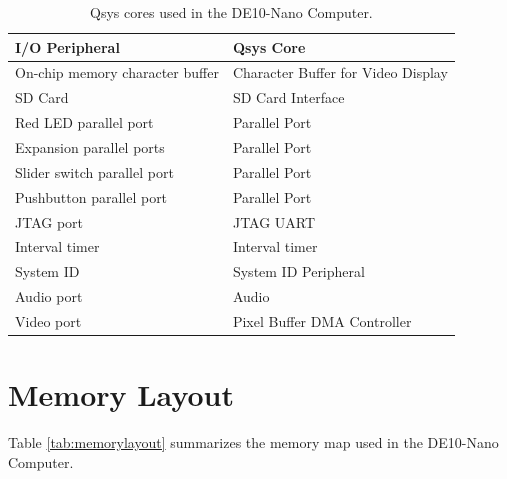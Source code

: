 \documentclass[11pt, twoside, pdftex]{article}
\newcommand{\commonFiles}{../../../common/doc}
\newcommand{\systemName}{DE10-Nano Computer}
\begin{document}
\begin{table}[h]
    \begin{center}
    \begin{tabular}{l|l}
            \textbf{I/O Peripheral}
            & \textbf{Qsys Core}
        \\\hline
            On-chip memory character buffer
				& Character Buffer for Video Display
        \\
            SD Card
        &   SD Card Interface
        \\
            Red LED parallel port
				& Parallel Port
        \\
            Expansion parallel ports
				& Parallel Port
        \\
            Slider switch parallel port
				& Parallel Port
        \\
            Pushbutton parallel port
				& Parallel Port
        \\
            JTAG port
				& JTAG UART
        \\
            Interval timer
				& Interval timer 
        \\
            System ID
				& System ID Peripheral
        \\
            Audio port
				& Audio
        \\
            Video port
				& Pixel Buffer DMA Controller
        \\
    \end{tabular}
    \caption{Qsys cores used in the \systemName.}
    \label{tab:sopcnames}
    \end{center}
\end{table}



\section{Memory Layout}

\noindent
Table \ref{tab:memorylayout} summarizes the memory map used in the \systemName.
~\\
\end{document}
